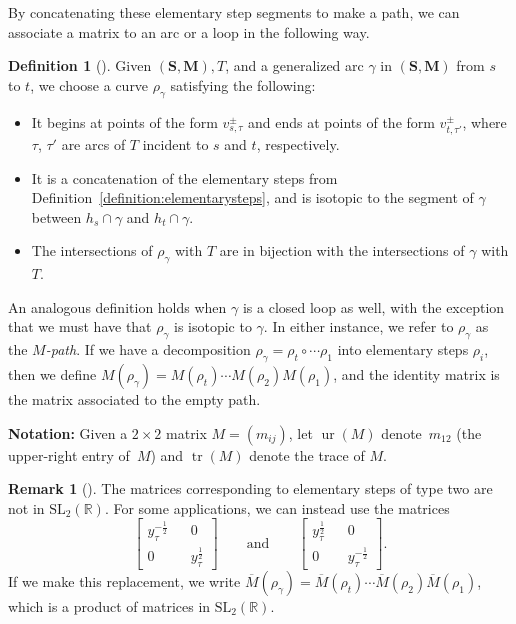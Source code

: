 \documentclass[pdftex]{sigma}
\numberwithin{equation}{section}
\theoremstyle{definition}
\newtheorem{Definition}[Theorem]{Definition}
\newtheorem{Remark}[Theorem]{Remark}
\newcommand{\SM}{(\mathbf{S}, \mathbf{M})}
\begin{document}
By concatenating these elementary step segments to make a path, we can associate a matrix to an arc or a loop in the following way.

\begin{Definition}[{\cite{MW13}}]
Given $\SM, T$, and a generalized arc $\gamma$ in $\SM$ from $s$ to $t$, we choose a curve $\rho_{\gamma}$ satisfying the following:
\begin{itemize}\itemsep=0pt
\item It begins at points of the form $v^{\pm}_{s, \tau}$ and ends at points of the form $v^{\pm}_{t, \tau'}$, where $\tau$, $\tau'$ are arcs of $T$ incident to $s$ and $t$, respectively.
\item It is a concatenation of the elementary steps from Definition~\ref{definition:elementarysteps}, and is isotopic to the segment of $\gamma$ between $h_s\cap \gamma$ and $h_t\cap \gamma$.
\item The intersections of $\rho_{\gamma}$ with $T$ are in bijection with the intersections of $\gamma$ with $T$.
\end{itemize}
An analogous definition holds when $\gamma$ is a closed loop as well, with the exception that we must have that $\rho_{\gamma}$ is isotopic to $\gamma$. In either instance, we refer to $\rho_{\gamma}$ as the \textit{$M$-path}. If we have a decomposition $\rho_{\gamma}=\rho_t\circ\cdots \rho_1$ into elementary steps $\rho_i$, then we define $M(\rho_{\gamma})=M(\rho_{t})\cdots M(\rho_{2})M(\rho_{1})$, and the identity matrix is the matrix associated to the empty path.
\end{Definition}

\noindent \textbf{Notation:}
Given a $2\times 2$ matrix $M=(m_{ij})$, let $\operatorname{ur}(M)$ denote~$m_{12}$ (the upper-right entry of~$M$) and $\operatorname{tr}(M)$ denote the trace of $M$.


\begin{Remark}[\cite{MW13}]
The matrices corresponding to elementary steps of type two are not in $\text{SL}_2(\mathbb{R})$. For some applications, we can instead use the matrices
\[\begin{bmatrix}
 y_{\tau}^{-\frac{1}{2}} && 0\\
 0 && y_{\tau}^{\frac{1}{2}}
\end{bmatrix}\qquad\text{and}\qquad
\begin{bmatrix}
 y_{\tau}^{\frac{1}{2}} && 0\\
 0 && y_{\tau}^{-\frac{1}{2}}
\end{bmatrix}.\]
If we make this replacement, we write $\overline{M}(\rho_{\gamma})=\overline{M}(\rho_{t})\cdots \overline{M}(\rho_{2})\overline{M}(\rho_{1})$, which is a product of matrices in $\text{SL}_2(\mathbb{R})$.
\end{Remark}
\end{document}
